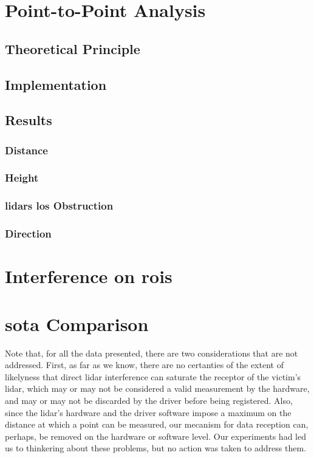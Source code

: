 \section{Point-to-Point Analysis}
\subsection{Theoretical Principle}
\subsection{Implementation}
\subsection{Results}
\subsubsection{Distance}
\subsubsection{Height}
\subsubsection{\acp{lidar} \ac{los} Obstruction}
\subsubsection{Direction}

\section{Interference on \acp{roi}}

\section{\acl{sota} Comparison}
Note that, for all the data presented, there are two considerations that are not addressed. First, as far as we know, there are no certanties of the extent of likelyness that direct \ac{lidar} interference can saturate the receptor of the victim's \ac{lidar}, which may or may not be considered a valid measurement by the hardware, and may or may not be discarded by the driver before being registered. Also, since the \ac{lidar}'s hardware and the driver software impose a maximum on the distance at which a point can be measured, our mecanism for data reception can, perhaps, be removed on the hardware or software level. Our experiments had led us to thinkering about these problems, but no action was taken to address them.

